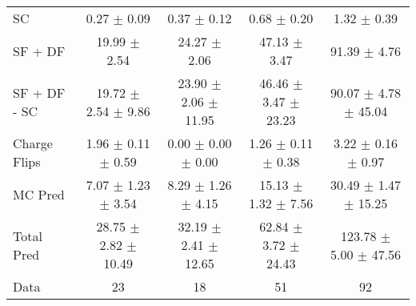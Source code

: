 \begin{tabular}{l|cccc}
                                 SC &  0.27 $\pm$  0.09 &  0.37 $\pm$  0.12 &  0.68 $\pm$  0.20 &  1.32 $\pm$  0.39 \\
                            SF + DF & 19.99 $\pm$  2.54 & 24.27 $\pm$  2.06 & 47.13 $\pm$  3.47 & 91.39 $\pm$  4.76 \\
\hline
                       SF + DF - SC & 19.72 $\pm$  2.54 $\pm$  9.86 & 23.90 $\pm$  2.06 $\pm$ 11.95 & 46.46 $\pm$  3.47 $\pm$ 23.23 & 90.07 $\pm$  4.78 $\pm$ 45.04 \\
\hline\hline
                       Charge Flips &  1.96 $\pm$  0.11 $\pm$  0.59 &  0.00 $\pm$  0.00 $\pm$  0.00 &  1.26 $\pm$  0.11 $\pm$  0.38 &  3.22 $\pm$  0.16 $\pm$  0.97 \\
\hline
                            MC Pred &  7.07 $\pm$  1.23 $\pm$  3.54 &  8.29 $\pm$  1.26 $\pm$  4.15 & 15.13 $\pm$  1.32 $\pm$  7.56 & 30.49 $\pm$  1.47 $\pm$ 15.25 \\
\hline
                         Total Pred & 28.75 $\pm$  2.82 $\pm$ 10.49 & 32.19 $\pm$  2.41 $\pm$ 12.65 & 62.84 $\pm$  3.72 $\pm$ 24.43 & 123.78 $\pm$  5.00 $\pm$ 47.56 \\
\hline\hline
                               Data &    23 &    18 &    51 &    92 \\
\hline\hline
\end{tabular}

